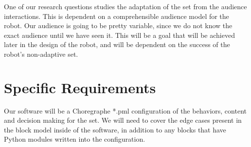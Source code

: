 \documentclass[onecolumn, draftclsnofoot,10pt, compsoc]{IEEEtran}
\begin{document}

One of our research questions studies the adaptation of the set from the audience interactions. This is dependent on a comprehensible audience model for the robot. Our audience is going to be pretty variable, since we do not know the exact audience until we have seen it. This will be a goal that will be achieved later in the design of the robot, and will be dependent on the success of the robot’s non-adaptive set.


\section{Specific Requirements}

Our software will be a Choregraphe *.pml configuration of the behaviors, content and decision making for the set. We will need to cover the edge cases present in the block model inside of the software, in addition to any blocks that have Python modules written into the configuration.
\end{document}
